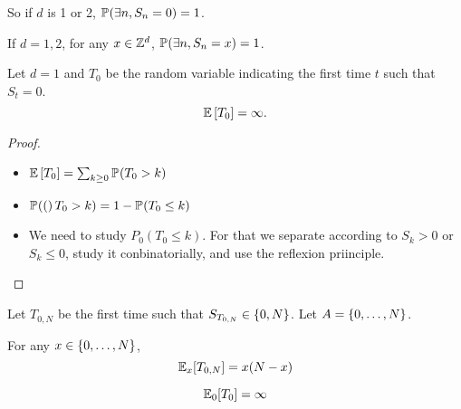     So if $d$ is 1 or 2, $\P{\exists n, S_n = 0} = 1$.

    \begin{corollary}
        If $d = 1, 2$, for any $x \in \Z^d$, 
        $\P{\exists n, S_n = x} = 1$.
    \end{corollary}

    \begin{proposition}
        Let $d = 1$ and $T_0$ be the random variable indicating the first time $t$ such that 
        $S_t = 0$. 
        \[
            \E{T_0} = \infty.
        \]
    \end{proposition}

    \begin{proof}
        \begin{itemize}
            \item $\E{T_0} = \sum_{k \geq 0} \P{T_0 > k}$
            \item $\P(T_0 > k) = 1 - \P{T_0 \leq k}$
            \item We need to study $P_0(T_0 \leq k)$.
                For that we separate according to $S_k > 0$ or $S_k \leq 0$,
                study it conbinatorially, and use the reflexion priinciple.
        \end{itemize}
    \end{proof}

    Let $T_{0, N}$ be the first time such that $S_{T_{0, N}} \in \set{0, N}$. 
    Let $A = \set{0, \dots, N}$.

    \begin{proposition}
        For any $x \in \set{0, \dots, N}$,
        \[
            \IE_x[T_{0,N}] = x(N - x)
        \]
    \end{proposition}

    \begin{corollary}
        \[
            \IE_0[T_0] = \infty
        \]
    \end{corollary}

